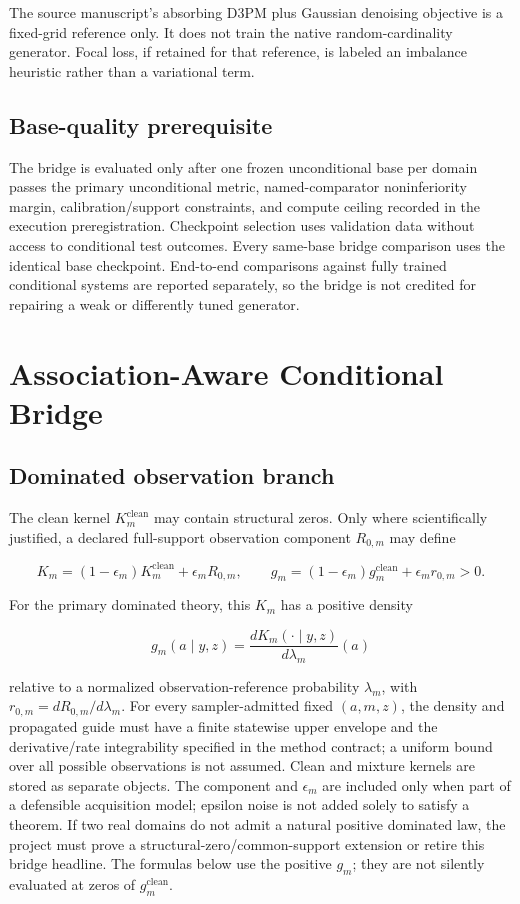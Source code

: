 \documentclass[11pt]{article}
\begin{document}
The source manuscript's absorbing D3PM plus Gaussian denoising objective is a fixed-grid reference only. It does not train the native random-cardinality generator. Focal loss, if retained for that reference, is labeled an imbalance heuristic rather than a variational term.

\subsection{Base-quality prerequisite}
\label{sec:base-quality-prerequisite}

The bridge is evaluated only after one frozen unconditional base per domain passes the primary unconditional metric, named-comparator noninferiority margin, calibration/\allowbreak{}support constraints, and compute ceiling recorded in the execution preregistration. Checkpoint selection uses validation data without access to conditional test outcomes. Every same-base bridge comparison uses the identical base checkpoint. End-to-end comparisons against fully trained conditional systems are reported separately, so the bridge is not credited for repairing a weak or differently tuned generator.

\section{Association-Aware Conditional Bridge}
\label{sec:association-aware-conditional-bridge}

\subsection{Dominated observation branch}
\label{sec:dominated-observation-branch}

The clean kernel \(K_m^{\mathrm{clean}}\) may contain structural zeros. Only where scientifically justified, a declared full-support observation component \(R_{0,m}\) may define

\[
K_m=(1-\epsilon_m)K_m^{\mathrm{clean}}+\epsilon_m R_{0,m},
\qquad
g_m=(1-\epsilon_m)g_m^{\mathrm{clean}}+\epsilon_m r_{0,m}>0.
\]

For the primary dominated theory, this \(K_m\) has a positive density

\[
g_m(a\mid y,z)
=\frac{dK_m(\cdot\mid y,z)}{d\lambda_m}(a)
\]

relative to a normalized observation-reference probability \(\lambda_m\), with \(r_{0,m}=dR_{0,m}/d\lambda_m\). For every sampler-admitted fixed \((a,m,z)\), the density and propagated guide must have a finite statewise upper envelope and the derivative/\allowbreak{}rate integrability specified in the method contract; a uniform bound over all possible observations is not assumed. Clean and mixture kernels are stored as separate objects. The component and \(\epsilon_m\) are included only when part of a defensible acquisition model; epsilon noise is not added solely to satisfy a theorem. If two real domains do not admit a natural positive dominated law, the project must prove a structural-zero/\allowbreak{}common-support extension or retire this bridge headline. The formulas below use the positive \(g_m\); they are not silently evaluated at zeros of \(g_m^{\mathrm{clean}}\).
\end{document}
